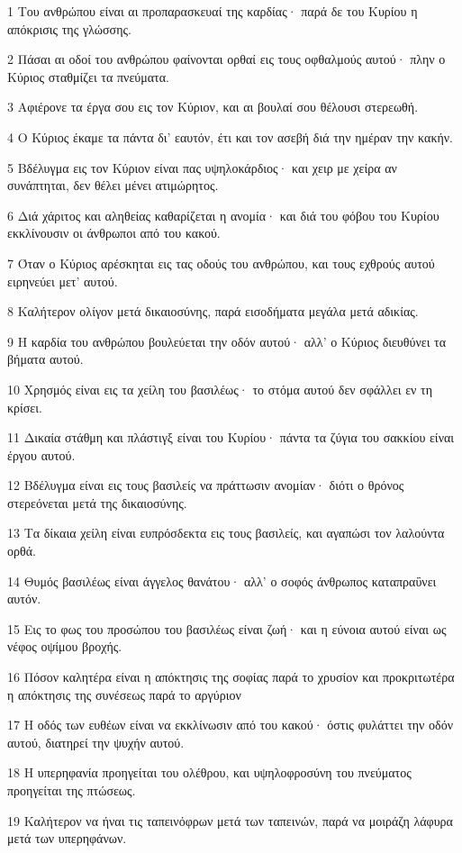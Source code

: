 \par 1 Του ανθρώπου είναι αι προπαρασκευαί της καρδίας· παρά δε του Κυρίου η απόκρισις της γλώσσης.
\par 2 Πάσαι αι οδοί του ανθρώπου φαίνονται ορθαί εις τους οφθαλμούς αυτού· πλην ο Κύριος σταθμίζει τα πνεύματα.
\par 3 Αφιέρονε τα έργα σου εις τον Κύριον, και αι βουλαί σου θέλουσι στερεωθή.
\par 4 Ο Κύριος έκαμε τα πάντα δι' εαυτόν, έτι και τον ασεβή διά την ημέραν την κακήν.
\par 5 Βδέλυγμα εις τον Κύριον είναι πας υψηλοκάρδιος· και χειρ με χείρα αν συνάπτηται, δεν θέλει μένει ατιμώρητος.
\par 6 Διά χάριτος και αληθείας καθαρίζεται η ανομία· και διά του φόβου του Κυρίου εκκλίνουσιν οι άνθρωποι από του κακού.
\par 7 Όταν ο Κύριος αρέσκηται εις τας οδούς του ανθρώπου, και τους εχθρούς αυτού ειρηνεύει μετ' αυτού.
\par 8 Καλήτερον ολίγον μετά δικαιοσύνης, παρά εισοδήματα μεγάλα μετά αδικίας.
\par 9 Η καρδία του ανθρώπου βουλεύεται την οδόν αυτού· αλλ' ο Κύριος διευθύνει τα βήματα αυτού.
\par 10 Χρησμός είναι εις τα χείλη του βασιλέως· το στόμα αυτού δεν σφάλλει εν τη κρίσει.
\par 11 Δικαία στάθμη και πλάστιγξ είναι του Κυρίου· πάντα τα ζύγια του σακκίου είναι έργου αυτού.
\par 12 Βδέλυγμα είναι εις τους βασιλείς να πράττωσιν ανομίαν· διότι ο θρόνος στερεόνεται μετά της δικαιοσύνης.
\par 13 Τα δίκαια χείλη είναι ευπρόσδεκτα εις τους βασιλείς, και αγαπώσι τον λαλούντα ορθά.
\par 14 Θυμός βασιλέως είναι άγγελος θανάτου· αλλ' ο σοφός άνθρωπος καταπραΰνει αυτόν.
\par 15 Εις το φως του προσώπου του βασιλέως είναι ζωή· και η εύνοια αυτού είναι ως νέφος οψίμου βροχής.
\par 16 Πόσον καλητέρα είναι η απόκτησις της σοφίας παρά το χρυσίον και προκριτωτέρα η απόκτησις της συνέσεως παρά το αργύριον
\par 17 Η οδός των ευθέων είναι να εκκλίνωσιν από του κακού· όστις φυλάττει την οδόν αυτού, διατηρεί την ψυχήν αυτού.
\par 18 Η υπερηφανία προηγείται του ολέθρου, και υψηλοφροσύνη του πνεύματος προηγείται της πτώσεως.
\par 19 Καλήτερον να ήναι τις ταπεινόφρων μετά των ταπεινών, παρά να μοιράζη λάφυρα μετά των υπερηφάνων.
